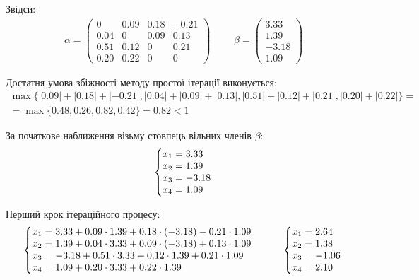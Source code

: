 \documentclass{article}
\begin{document}
\begin{large}
		Звідси:
		\begin{gather}
			\alpha=\begin{pmatrix}
				0 & 0.09 & 0.18 & -0.21\\
				0.04 & 0 & 0.09 & 0.13\\
				0.51 & 0.12 & 0 & 0.21\\
				0.20 & 0.22 & 0 & 0
			\end{pmatrix}\nonumber\hspace{28pt}
			\beta=\begin{pmatrix}
				3.33\\
				1.39\\
				-3.18\\
				1.09
			\end{pmatrix}\nonumber
		\end{gather}
	
		Достатня умова збіжності методу простої ітерації виконується:
		\begin{gather}\nonumber
			\max\{|0.09|+|0.18|+|-0.21|,|0.04|+|0.09|+|0.13|,|0.51|+|0.12|+|0.21|,|0.20|+|0.22|\}=\\\nonumber=\max\{0.48,0.26,0.82,0.42\}=0.82<1\nonumber
		\end{gather}
	
		За початкове наближення візьму стовпець вільних членів $\beta$:
		\begin{gather}
			\left\{\begin{array}{@{}l@{}}
				x_1=3.33\\\nonumber
				x_2=1.39\\\nonumber
				x_3=-3.18\\\nonumber
				x_4=1.09\nonumber
			\end{array}\right.\,
		\end{gather}
	
		Перший крок ітераційного процесу:
		\begin{gather}
			\left\{\begin{array}{@{}l@{}}
				x_1=3.33+0.09\cdot1.39+0.18\cdot(-3.18)-0.21\cdot1.09\\\nonumber
				x_2=1.39+0.04\cdot3.33+0.09\cdot(-3.18)+0.13\cdot1.09\\\nonumber
				x_3=-3.18+0.51\cdot3.33+0.12\cdot1.39+0.21\cdot1.09\\\nonumber
				x_4=1.09+0.20\cdot3.33+0.22\cdot1.39\nonumber
			\end{array}\right.\,\hspace{28pt}
			\left\{\begin{array}{@{}l@{}}
				x_1=2.64\\\nonumber
				x_2=1.38\\\nonumber
				x_3=-1.06\\\nonumber
				x_4=2.10\nonumber
			\end{array}\right.\,
		\end{gather}
	

\end{large}
\end{document}
